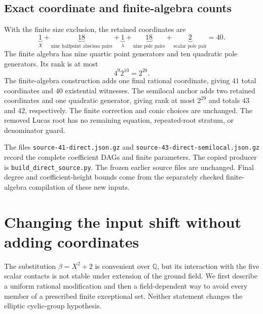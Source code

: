 \documentclass[11pt]{article}
\theoremstyle{definition}
\begin{document}
\subsection{Exact coordinate and finite-algebra counts}

With the finite size exclusion, the retained coordinates are
\[
 \underbrace{1}_{X}+
 \underbrace{18}_{\text{nine halfpoint abscissa pairs}}+
 \underbrace{1}_{\lambda}+
 \underbrace{18}_{\text{nine pole pairs}}+
 \underbrace{2}_{\text{scalar pole pair}}=40.
\]
The finite algebra has nine quartic point generators and ten
quadratic pole generators.  Its rank is at most
\[
                            4^9 2^{10}=2^{28}.
\]
The finite-algebra construction adds one final rational coordinate,
giving $41$ total coordinates and $40$ existential witnesses.
The semilocal anchor adds two retained coordinates and one
quadratic generator, giving rank at most $2^{29}$ and totals
$43$ and $42$, respectively.  The finite correction and conic
choices are unchanged.  The removed Lucas root has no remaining
equation, repeated-root stratum, or denominator guard.

The files \texttt{source-41-direct.json.gz} and
\texttt{source-43-direct-semilocal.json.gz} record the complete
coefficient DAGs and finite parameters.  The copied producer is
\texttt{build\_direct\_source.py}.  The frozen earlier source
files are unchanged.  Final degree and coefficient-height bounds
come from the separately checked finite-algebra compilation of
these new inputs.


\section{Changing the input shift without adding coordinates}
\label{sec:p3-beta-shift}

The substitution $\beta=X^2+2$ is convenient over $\mathbb Q$, but its
interaction with the five scalar contacts is not stable under extension
of the ground field. We first describe a uniform rational modification
and then a field-dependent way to avoid every member of a prescribed
finite exceptional set. Neither statement changes the elliptic
cyclic-group hypothesis.
\end{document}
